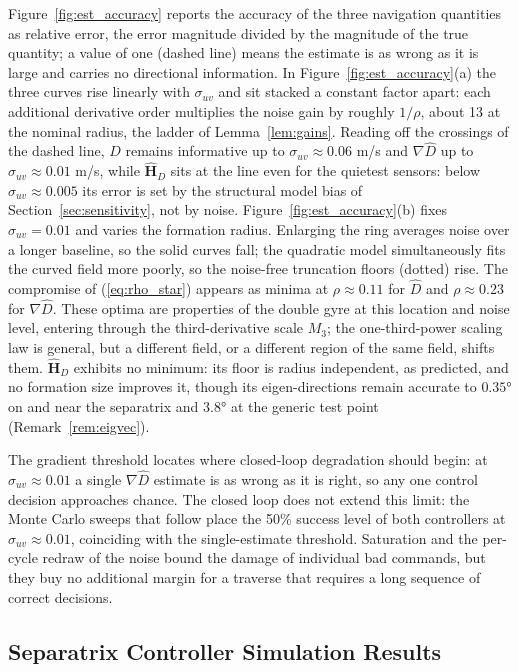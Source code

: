 \documentclass[12pt, letterpaper, oneside]{report}
\begin{document}
Figure~\ref{fig:est_accuracy} reports the accuracy of the three navigation
quantities as relative error, the error magnitude divided by the
magnitude of the true quantity; a value of one (dashed line) means the
estimate is as wrong as it is large and carries no directional
information. In Figure~\ref{fig:est_accuracy}(a) the three curves rise
linearly with $\sigma_{uv}$ and sit stacked a constant factor apart: each
additional derivative order multiplies the noise gain by roughly
$1/\rho$, about 13 at the nominal radius, the ladder of
Lemma~\ref{lem:gains}. Reading off the crossings of the dashed line,
$\hat{D}$ remains informative up to $\sigma_{uv} \approx 0.06$ m/s and
$\nabla\hat{D}$ up to $\sigma_{uv} \approx 0.01$ m/s, while
$\hat{\mathbf{H}}_D$ sits at the line even for the quietest sensors:
below $\sigma_{uv} \approx 0.005$ its error is set by the structural
model bias of Section~\ref{sec:sensitivity}, not by noise.
Figure~\ref{fig:est_accuracy}(b) fixes $\sigma_{uv} = 0.01$ and varies the
formation radius. Enlarging the ring averages noise over a longer
baseline, so the solid curves fall; the quadratic model simultaneously
fits the curved field more poorly, so the noise-free truncation floors
(dotted) rise. The compromise of (\ref{eq:rho_star}) appears as minima
at $\rho \approx 0.11$ for $\hat{D}$ and $\rho \approx 0.23$ for
$\nabla\hat{D}$. These optima are properties of the double gyre at this
location and noise level, entering through the third-derivative scale
$M_3$; the one-third-power scaling law is general, but a different
field, or a different region of the same field, shifts them.
$\hat{\mathbf{H}}_D$ exhibits no minimum: its floor is radius
independent, as predicted, and no formation size improves it, though its
eigen-directions remain accurate to $0.35°$ on and near the
separatrix and $3.8°$ at the generic test point
(Remark~\ref{rem:eigvec}).

The gradient threshold locates where closed-loop degradation should
begin: at $\sigma_{uv} \approx 0.01$ a single $\nabla\hat{D}$ estimate
is as wrong as it is right, so any one control decision approaches
chance. The closed loop does not extend this limit: the Monte Carlo
sweeps that follow place the 50\% success level of both controllers at
$\sigma_{uv} \approx 0.01$, coinciding with the single-estimate
threshold. Saturation and the per-cycle redraw of the noise bound the
damage of individual bad commands, but they buy no additional margin
for a traverse that requires a long sequence of correct decisions.

\subsection{Separatrix Controller Simulation Results}
\end{document}
